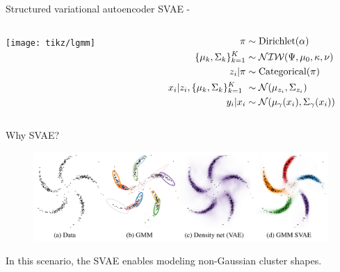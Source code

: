 \documentclass[10pt, compress]{beamer}
\begin{document}
\begin{frame}{Structured variational autoencoder}
  SVAE - \cite{Johnson2016}
  \centering
  \begin{columns}
    \begin{column}{0.3\textwidth}
      \texttt{[image: tikz/lgmm]}
    \end{column}
    \begin{column}{0.3\textwidth}
      \begin{align*}
        \pi &\sim \textrm{Dirichlet}(\alpha) \\
        \{\mu_k, \Sigma_k\}_{k = 1}^K &\sim \mathcal{NIW}(\Psi, \mu_0, \kappa, \nu) \\
        z_i | \pi &\sim \textrm{Categorical}(\pi) \\
        x_i | z_i, \{\mu_k, \Sigma_k\}_{k = 1}^K \ &\sim \mathcal{N}(\mu_{z_i}, \Sigma_{z_i}) \\
        y_i | x_i &\sim \mathcal{N}(\mu_\gamma(x_i), \Sigma_\gamma(x_i))
      \end{align*}
    \end{column}
  \end{columns}
\end{frame}

\begin{frame}{Why SVAE?}
  \begin{center}
    \begin{figure}
    \includegraphics[frame,width=\textwidth]{img/svae-example}
    \caption{\cite{Johnson2016}}
    \end{figure}
  \end{center}

  \pause
  In this scenario, the SVAE enables modeling non-Gaussian cluster shapes.
\end{frame}
\end{document}
